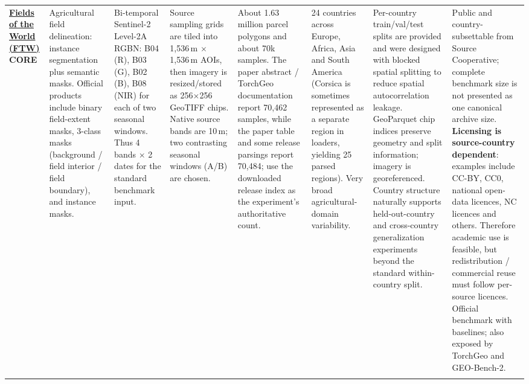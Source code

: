 \documentclass[11pt,a4paper]{article}
\begin{document}
\begin{landscape}
\begin{longtable}{
    Q{1.8cm}
    Q{2.5cm}
    Q{3.0cm}
    Q{2.5cm}
    Q{2.1cm}
    Q{3.0cm}
    Q{3.4cm}
    Q{3.4cm}
}
\href{https://source.coop/kerner-lab/fields-of-the-world}{\textbf{Fields of the World (FTW)}}\newline
\textbf{CORE}
&
Agricultural field delineation: instance segmentation plus semantic masks. Official products include binary field-extent masks, 3-class masks (background / field interior / field boundary), and instance masks.
&
Bi-temporal Sentinel-2 Level-2A RGBN: B04 (R), B03 (G), B02 (B), B08 (NIR) for each of two seasonal windows. Thus 4 bands $\times$ 2 dates for the standard benchmark input.
&
Source sampling grids are tiled into 1,536\,m $\times$ 1,536\,m AOIs, then imagery is resized/stored as 256$\times$256 GeoTIFF chips. Native source bands are 10\,m; two contrasting seasonal windows (A/B) are chosen.
&
About 1.63 million parcel polygons and about 70k samples. The paper abstract / TorchGeo documentation report 70,462 samples, while the paper table and some release parsings report 70,484; use the downloaded release index as the experiment's authoritative count.
&
24 countries across Europe, Africa, Asia and South America (Corsica is sometimes represented as a separate region in loaders, yielding 25 parsed regions). Very broad agricultural-domain variability.
&
Per-country train/val/test splits are provided and were designed with blocked spatial splitting to reduce spatial autocorrelation leakage. GeoParquet chip indices preserve geometry and split information; imagery is georeferenced. Country structure naturally supports held-out-country and cross-country generalization experiments beyond the standard within-country split.
&
Public and country-subsettable from Source Cooperative; complete benchmark size is not presented as one canonical archive size. \textbf{Licensing is source-country dependent}: examples include CC-BY, CC0, national open-data licences, NC licences and others. Therefore academic use is feasible, but redistribution / commercial reuse must follow per-source licences. Official benchmark with baselines; also exposed by TorchGeo and GEO-Bench-2.
\\
\addlinespace


\end{longtable}
\end{landscape}
\end{document}
